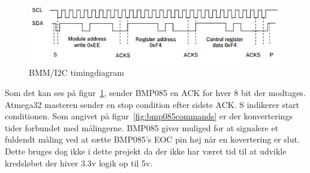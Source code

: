 \begin{figure}[h]
	\centering
	\includegraphics[width=0.9\linewidth]{figs/bmp_i2c_timing}
	\caption{BMM/I2C timingdiagram}
	\label{fig:bmpi2ctiming}
\end{figure}

Som det kan ses på figur~\ref{fig:bmpi2ctiming}, sender BMP085 en ACK for hver 8 bit der modtages. Atmega32 masteren sender en stop condition efter sidste ACK. S indikerer start conditionen.
Som angivet på figur~\ref{fig:bmp085commands} er der konverterings tider forbundet med målingerne. BMP085 giver muliged for at signalere et fuldendt måling ved at sætte BMP085’s EOC pin høj når en kovertering er slut. Dette bruges dog ikke i dette projekt da der ikke har været tid til at udvikle kredsløbet der hiver 3.3v logik op til 5v.





